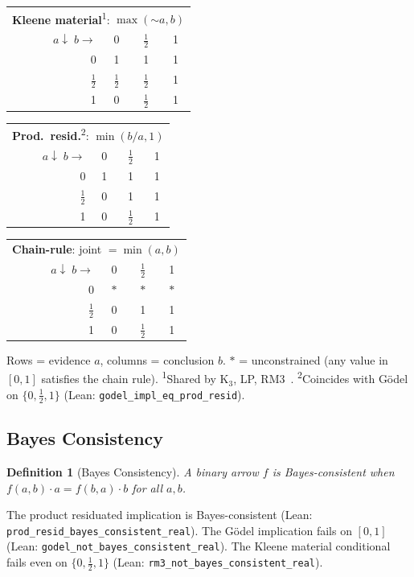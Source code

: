 \documentclass[11pt,a4paper]{article}
\newtheorem{definition}[theorem]{Definition}
\newcommand{\negc}{\mathord{\sim}}
\begin{document}
\begin{center}
\small
\begin{tabular}{r|ccc}
\multicolumn{4}{c}{\textbf{Kleene material}\textsuperscript{1}: $\max(\negc a, b)$} \\
$a \!\downarrow\; b \!\to$ & 0 & $\tfrac{1}{2}$ & 1 \\
\hline
0 & 1 & 1 & 1 \\
$\tfrac{1}{2}$ & $\tfrac{1}{2}$ & $\tfrac{1}{2}$ & 1 \\
1 & 0 & $\tfrac{1}{2}$ & 1
\end{tabular}
\quad
\begin{tabular}{r|ccc}
\multicolumn{4}{c}{\textbf{Prod.\ resid.}\textsuperscript{2}: $\min(b/a, 1)$} \\
$a \!\downarrow\; b \!\to$ & 0 & $\tfrac{1}{2}$ & 1 \\
\hline
0 & 1 & 1 & 1 \\
$\tfrac{1}{2}$ & 0 & 1 & 1 \\
1 & 0 & $\tfrac{1}{2}$ & 1
\end{tabular}
\quad
\begin{tabular}{r|ccc}
\multicolumn{4}{c}{\textbf{Chain-rule}: joint $= \min(a,b)$} \\
$a \!\downarrow\; b \!\to$ & 0 & $\tfrac{1}{2}$ & 1 \\
\hline
0 & $*$ & $*$ & $*$ \\
$\tfrac{1}{2}$ & 0 & 1 & 1 \\
1 & 0 & $\tfrac{1}{2}$ & 1
\end{tabular}
\normalsize
\end{center}
\smallskip
{\footnotesize Rows = evidence $a$, columns = conclusion $b$.
$*$ = unconstrained (any value in $[0,1]$ satisfies the chain rule).
\textsuperscript{1}Shared by K$_3$, LP, RM3~\cite{priest2008}.
\textsuperscript{2}Coincides with G\"odel on $\{0, \tfrac{1}{2}, 1\}$
(Lean: \texttt{godel\_impl\_eq\_prod\_resid}).}

\subsection{Bayes Consistency}

\begin{definition}[Bayes Consistency]
\label{def:bayes}
A binary arrow $f$ is \emph{Bayes-consistent} when
$f(a, b) \cdot a = f(b, a) \cdot b$ for all $a, b$.
\end{definition}

The product residuated implication is Bayes-consistent
(Lean: \texttt{prod\_resid\_bayes\_consistent\_real}).
The G\"odel implication fails on $[0,1]$
(Lean: \texttt{godel\_not\_bayes\_consistent\_real}).
The Kleene material conditional fails even on
$\{0, \tfrac{1}{2}, 1\}$
(Lean: \texttt{rm3\_not\_bayes\_consistent\_real}).
\end{document}
